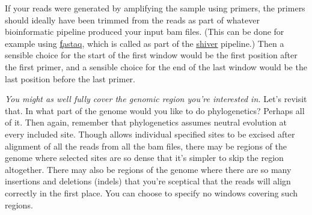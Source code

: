 If your reads were generated by amplifying the sample using primers, the primers should ideally have been trimmed from the reads as part of whatever bioinformatic pipeline produced your input bam files.
(This can be done for example using \href{https://github.com/sanger-pathogens/Fastaq}{\color{blue} \underline{\c{fastaq}}}, which is called as part of the \href{https://github.com/ChrisHIV/shiver}{\c{\color{blue} \underline{shiver}}} pipeline.)
Then a sensible choice for the start of the first window would be the first position after the first primer, and a sensible choice for the end of the last window would be the last position before the last primer.

{\it You might as well fully cover the genomic region you're interested in.}
Let's revisit that.
In what part of the genome would you like to do phylogenetics?
Perhaps all of it.
Then again, remember that phylogenetics assumes neutral evolution at every included site.
Though \pmt allows individual specified sites to be excised after alignment of all the reads from all the bam files, there may be regions of the genome where selected sites are so dense that it's simpler to skip the region altogether.
There may also be regions of the genome where there are so many insertions and deletions (indels) that you're sceptical that the reads will align correctly in the first place.
You can choose to specify no windows covering such regions.

